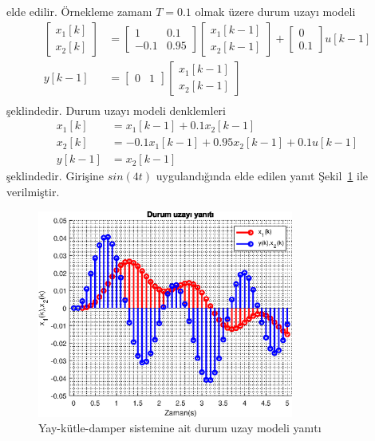 elde edilir. Örnekleme zamanı $T=0.1$ olmak üzere durum uzayı modeli
\begin{equation}
    \begin{split}
\begin{bmatrix}
    x_1[k]\\
    x_2[k]
\end{bmatrix}&=
\begin{bmatrix}
    1& 0.1\\
    -0.1& 0.95
\end{bmatrix}\begin{bmatrix}
    x_1[k-1]\\
    x_2[k-1]
\end{bmatrix}+\begin{bmatrix}
    0\\
    0.1
\end{bmatrix}u[k-1]\\
y[k-1]&=\begin{bmatrix}
    0& 1
\end{bmatrix}\begin{bmatrix}
    x_1[k-1]\\
    x_2[k-1]
\end{bmatrix}\\
\end{split}
\end{equation}
şeklindedir. Durum uzayı modeli denklemleri
\begin{equation}
    \begin{split}
    x_1[k]&=x_1[k-1]+0.1x_2[k-1]\\
    x_2[k]&=-0.1x_1[k-1]+0.95x_2[k-1]+0.1u[k-1]\\
    y[k-1]&=x_2[k-1]
\end{split}
\end{equation}
şeklindedir. Girişine $sin(4t)$ uygulandığında elde edilen yanıt Şekil~\ref{fig:lec11_plot1} ile verilmiştir.
\begin{figure}[!htb]
    \centering
    \includegraphics[width=0.75\textwidth]{img/lec11_plot1}
    \caption{Yay-kütle-damper sistemine ait durum uzay modeli yanıtı}
    \label{fig:lec11_plot1}
\end{figure}

